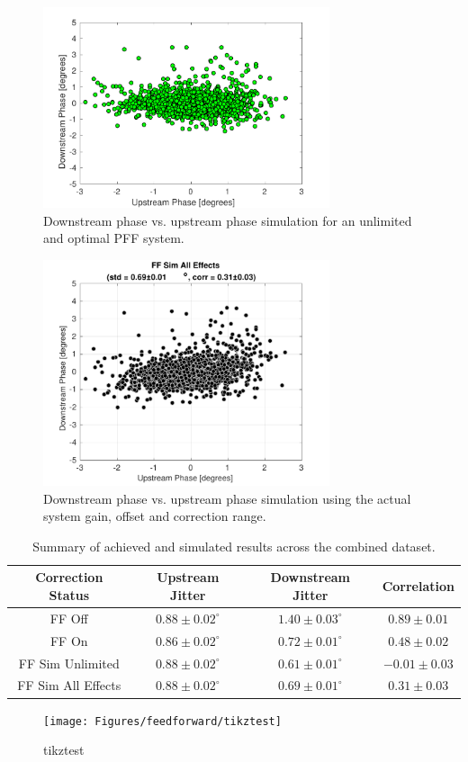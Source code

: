 \begin{figure}
  \centering
  \includegraphics[width=0.75\textwidth]{Figures/feedforward/longFF_scatterFFSimOpt}
  \caption{Downstream phase vs. upstream phase simulation for an unlimited and optimal PFF system.}
  \label{f:longFF_scatterFFSimOpt}
\end{figure}

\begin{figure}
  \centering
  \includegraphics[width=0.75\textwidth]{Figures/feedforward/longFF_scatterFFSimReal}
  \caption{Downstream phase vs. upstream phase simulation using the actual system gain, offset and correction range.}
  \label{f:longFF_scatterFFSimReal}
\end{figure}

\begin{table}
  \begin{center}
    \begin{tabular}{| c | c | c | c |}
	   \hline
       Correction Status & Upstream Jitter & Downstream Jitter & Correlation \\ \hline
       FF Off & \(0.88\pm0.02^\circ\) & \(1.40\pm0.03^\circ\) & \(0.89\pm0.01\) \\
	   FF On & \(0.86\pm0.02^\circ\) & \(0.72\pm0.01^\circ\) & \(0.48\pm0.02\) \\
	   FF Sim Unlimited & \(0.88\pm0.02^\circ\) & \(0.61\pm0.01^\circ\) & \(-0.01\pm0.03\) \\
	   FF Sim All Effects & \(0.88\pm0.02^\circ\) & \(0.69\pm0.01^\circ\) & \(0.31\pm0.03\) \\
    \hline
    \end{tabular}
    \caption{Summary of achieved and simulated results across the combined dataset.}
  	\label{t:LongFF}
  \end{center}
\end{table}


\begin{figure}
  \centering
  \texttt{[image: Figures/feedforward/tikztest]}
  \caption{tikztest}
\end{figure}